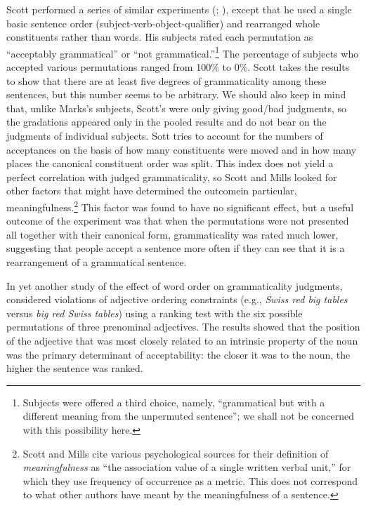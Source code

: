 Scott performed a series of similar experiments (\citealt{Scott1969}; \citealt{ScottEtAl1973}), except that he used a single basic sentence order (subject-verb-object-qualifier) and rearranged whole constituents rather than words. His subjects rated each permutation as ``acceptably grammatical'' or ``not grammatical.''\footnote{Subjects were offered a third choice, namely, ``grammatical but with a different meaning from the unpermuted sentence''; we shall not be concerned with this possibility here.}
The percentage of subjects who accepted various permutations ranged from 100\% to 0\%. Scott takes the results to show that there are at least five degrees of grammaticality among these sentences, but this number seems to be arbitrary. We should also keep in mind that, unlike Marks's subjects, Scott's were only giving good/bad judgments, so the gradations appeared only in the pooled results and do not bear on the judgments of individual subjects. Sott tries to account for the numbers of acceptances on the basis of how many constituents were moved and in how many places the canonical constituent order was split. This index does not yield a perfect correlation with judged grammaticality, so Scott and Mills looked for other factors that might have determined the outcome\schdash{}in particular, meaningfulness.\footnote{Scott and Mills cite various psychological sources for their definition of \textit{meaningfulness} as ``the association value of a single written verbal unit,'' for which they use frequency of occurrence as a metric. This does not correspond to what other authors have meant by the meaningfulness of a sentence.}
This factor was found to have no significant effect, but a useful outcome of the experiment was that when the permutations were not presented all together with their canonical form, grammaticality was rated much lower, suggesting that people accept a sentence more often if they can see that it is a rearrangement of a grammatical sentence.

In yet another study of the effect of word order on grammaticality judgments, \citet{DanksEtAl1971} considered violations of adjective ordering constraints (e.g., \textit{Swiss red big tables} versus \textit{big red Swiss tables}) using a ranking test with the six possible permutations of three prenominal adjectives. The results showed that the position of the adjective that was most closely related to an intrinsic property of the noun was the primary determinant of acceptability: the closer it was to the noun, the higher the sentence was ranked.

